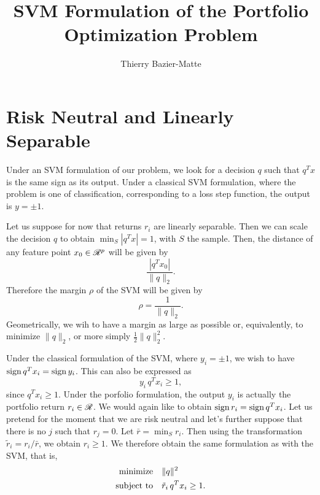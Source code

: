\documentclass{article}
\title{SVM Formulation of the Portfolio Optimization Problem}
\author{Thierry Bazier-Matte}
\begin{document}
\maketitle

\section{Risk Neutral and Linearly Separable}


Under an SVM formulation of our problem, we look for a decision $q$ such that $q^Tx$ is
the same sign as its output. Under a classical SVM formulation, where the problem is one
of classification, corresponding to a loss step function, the output is $y=\pm 1$.

Let us suppose for now that returns $r_i$ are linearly separable. Then we can scale the
decision $q$ to obtain $\min_S|q^Tx| = 1$, with $S$ the sample. Then, the distance of any
feature point $x_0\in\mathscr{R}^p$ will be given by
\[
  \frac{|q^Tx_0|}{\|q\|_2}.
\]
Therefore the margin $\rho$ of the SVM will be given by
\[
  \rho = \frac{1}{\|q\|_2}.
\]
Geometrically, we wih to have a margin as large as possible or, equivalently, to minimize
$\|q\|_2$, or more simply $\frac{1}{2}\|q\|^2_2$. 

Under the classical formulation of the SVM, where $y_i=\pm1$, we wish to have $\operatorname{sign}
q^Tx_i = \operatorname{sign} y_i$. This can also be expressed as
\[
  y_i\,q^Tx_i \geq 1,
\]
since $q^Tx_i\geq1$. Under the porfolio formulation, the output $y_i$ is actually the
portfolio return $r_i\in\mathscr{R}$. We would again like to obtain $\operatorname{sign} r_i = \operatorname{sign}
q^Tx_i$. Let us pretend for the moment that we are risk neutral and let's further suppose
that there is no $j$ such that $r_j=0$. Let $\bar r = \min_S r_i$. Then using the
transformation $\tilde r_i = r_i/\bar r$, we obtain $r_i \geq 1$. We therefore obtain the
same formulation as with the SVM, that is,
\begin{align*}
  \minimizeEquationSt{\|q\|^2}{\tilde r_i\,q^Tx_i\geq 1}.
\end{align*}
\end{document}
